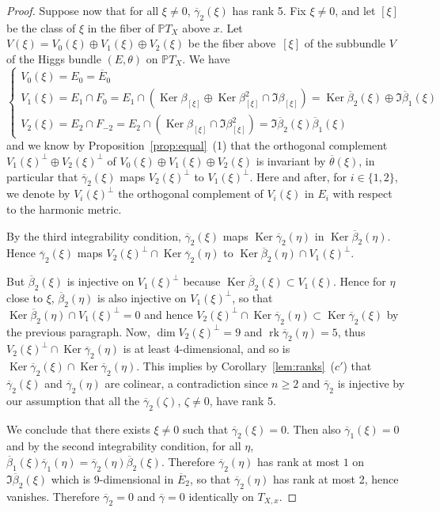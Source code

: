 \documentclass[JEP,XML,SOM,Unicode,NoFloatCountersInSection]{cedram}
\theoremstyle{plain}
\theoremstyle{definition}
\let\ov\overline
\DeclareMathOperator{\Ker}{Ker}
\DeclareMathOperator{\rk}{rk}
\newcommand{\PTX}{{\mathbb{P}T_X}}
\newcommand{\ovE}{\ov{E}}
\newcommand{\ovb}{\ov{\beta}}
\newcommand{\ovg}{\ov{\gamma}}
\newcommand{\ovt}{\ov{\theta}}
\begin{document}
\begin{proof}
Suppose now that for all $\xi\neq 0$, $\ovg_2(\xi)$ has rank 5. Fix $\xi\neq 0$, and let
$[\xi]$ be the class of $\xi$ in the fiber of $\PTX$ above $x$. Let $V(\xi)=V_0(\xi)\oplus
V_1(\xi)\oplus V_2(\xi)$ be the fiber above~$[\xi]$ of the subbundle $V$ of the Higgs bundle
$(E,\theta)$ on $\PTX$. We have
$$
\begin{cases}
V_0(\xi)=E_0=\ovE_0 \\
V_1(\xi)=E_1\cap F_0=E_1\cap(\Ker\beta_{[\xi]}\oplus\Ker\beta_{[\xi]}^2\cap\Im\beta_{[\xi]})=\Ker\ovb_2(\xi)\oplus\Im\ovb_1(\xi)\\
V_2(\xi)=E_2\cap F_{-2}= E_2\cap(\Ker\beta_{[\xi]}\cap\Im\beta^2_{[\xi]})=\Im\ovb_2(\xi)\ovb_1(\xi)
\end{cases}
$$
and we know by Proposition~\ref{prop:equal}~(1) that the orthogonal complement $V_1(\xi)^\perp\oplus
V_2(\xi)^\perp$ of $V_0(\xi)\oplus V_1(\xi)\oplus V_2(\xi)$ is invariant by $\ovt(\xi)$, in particular that
$\ovg_2(\xi)$ maps $V_2(\xi)^\perp$ to $V_1(\xi)^\perp$. Here and after, for $i\in\{1,2\}$, we
denote by $V_i(\xi)^\perp$ the
orthogonal complement of $V_i(\xi)$ in $E_i$ with respect to the harmonic metric.

By the third integrability condition, $\ovg_2(\xi)$ maps
$\Ker\ovg_2(\eta)$ in $\Ker\ovb_2(\eta)$. Hence $\ovg_2(\xi)$ maps
$V_2(\xi)^\perp\cap\Ker\ovg_2(\eta)$ to
$\Ker\ovb_2(\eta)\cap V_1(\xi)^\perp$.

But $\ovb_2(\xi)$ is injective on $V_1(\xi)^\perp$ because $\Ker\ovb_2(\xi)\subset
V_1(\xi)$. Hence for $\eta$ close to $\xi$, $\ovb_2(\eta)$ is also injective on $V_1(\xi)^\perp$, so that
$\Ker\ovb_2(\eta)\cap V_1(\xi)^\perp=0$ and hence
$V_2(\xi)^\perp\cap\Ker\ovg_2(\eta)\subset\Ker\ovg_2(\xi)$ by the previous paragraph. Now, \hbox{$\dim
V_2(\xi)^\perp=9$} and
$\rk\ovg_2(\eta)=5$, thus $V_2(\xi)^\perp\cap\Ker\ovg_2(\eta)$ is at least 4-dimensional, and so is \hbox{$\Ker\ovg_2(\xi)\cap\Ker\ovg_2(\eta)$}. This implies
by Corollary~\ref{lem:ranks}~($c'$) that $\ovg_2(\xi)$ and
$\ovg_2(\eta)$ are colinear, a contradiction since $n\geq 2$ and $\bar\gamma_2$ is injective by our
assumption that all the $\ovg_2(\zeta)$, $\zeta\neq 0$, have rank 5.

We conclude that there exists $\xi\neq 0$ such that $\ovg_2(\xi)=0$. Then also $\ovg_1(\xi)=0$ and by
the second integrability condition, for all $\eta$, $\ovb_1(\xi)\ovg_1(\eta) =
\ovg_2(\eta)\ovb_2(\xi)$. Therefore
$\ovg_2(\eta)$ has rank at most $1$ on $\Im\ovb_2(\xi)$ which is 9-dimensional in $\ovE_2$, so that
$\ovg_2(\eta)$ has
rank at most 2, hence vanishes. Therefore $\ovg_2=0$ and $\ovg=0$ identically on $T_{X,x}$.
\end{proof}
\end{document}
